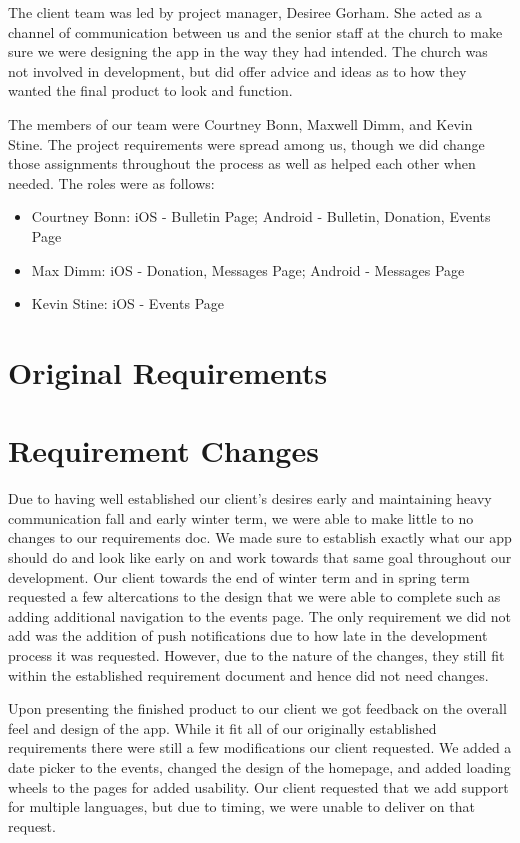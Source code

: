 \documentclass[letterpaper,10pt,draftclsnofoot,onecolumn,titlepage]{IEEEtran}
\begin{document}
The client team was led by project manager, Desiree Gorham.
She acted as a channel of communication between us and the senior staff at the church to make sure we were designing the app in the way they had intended.
The church was not involved in development, but did offer advice and ideas as to how they wanted the final product to look and function.

The members of our team were Courtney Bonn, Maxwell Dimm, and Kevin Stine.
The project requirements were spread among us, though we did change those assignments throughout the process as well as helped each other when needed.
The roles were as follows:

\begin{itemize}
	\item Courtney Bonn: iOS - Bulletin Page; Android - Bulletin, Donation, Events Page
	\item Max Dimm: iOS - Donation, Messages Page; Android - Messages Page
	\item Kevin Stine: iOS - Events Page
\end{itemize}

\section{Original Requirements}

	

\section{Requirement Changes}
	Due to having well established our client’s desires early and maintaining heavy communication fall and early winter term, we were able to make little to no changes to our requirements doc. 
We made sure to establish exactly what our app should do and look like early on and work towards that same goal throughout our development. 
Our client towards the end of winter term and in spring term requested a few altercations to the design that we were able to complete such as adding additional navigation to the events page. 
The only requirement we did not add was the addition of push notifications due to how late in the development process it was requested. 
However, due to the nature of the changes, they still fit within the established requirement document and hence did not need changes.

	Upon presenting the finished product to our client we got feedback on the overall feel and design of the app. 
While it fit all of our originally established requirements there were still a few modifications our client requested. 
We added a date picker to the events, changed the design of the homepage, and added loading wheels to the pages for added usability. 
Our client requested that we add support for multiple languages, but due to timing, we were unable to deliver on that request. 
\end{document}
